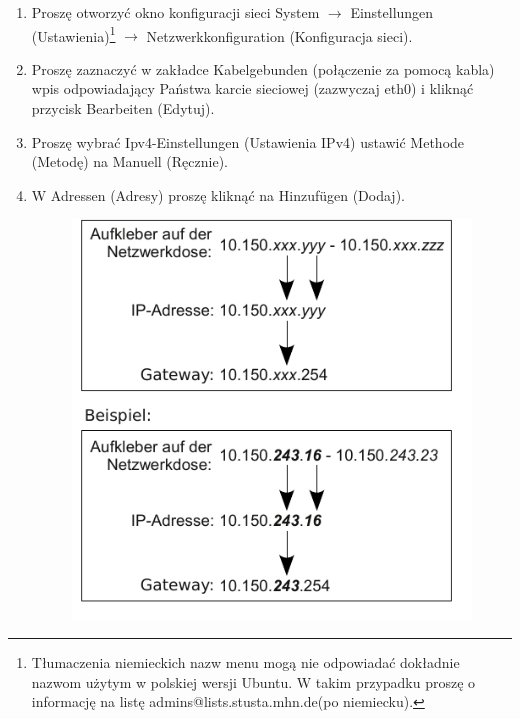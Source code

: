 \documentclass[a4paper,12pt]{scrartcl}
\begin{document}
\begin{enumerate}
    \item Proszę otworzyć okno konfiguracji sieci System $\rightarrow$ Einstellungen (Ustawienia)\footnote{Tłumaczenia niemieckich nazw menu mogą nie odpowiadać dokładnie nazwom użytym w polskiej wersji Ubuntu. W takim przypadku proszę o informację na listę admins@lists.stusta.mhn.de(po niemiecku).} $\rightarrow$ Netzwerkkonfiguration (Konfiguracja sieci).
    \item Proszę zaznaczyć w zakładce Kabelgebunden (połączenie za pomocą kabla) wpis odpowiadający Państwa karcie sieciowej (zazwyczaj eth0) i kliknąć przycisk Bearbeiten (Edytuj).
    \item Proszę wybrać Ipv4-Einstellungen (Ustawienia IPv4) ustawić Methode (Metodę) na Manuell (Ręcznie).
    \item W Adressen (Adresy) proszę kliknąć na Hinzufügen (Dodaj).
      \begin{figure}[h!]
        \centering
        \begin{minipage}[c]{0.45\linewidth}
          \centering
          \includegraphics[width=\linewidth,keepaspectratio]{Bilder/IP_Gerneric}
        \end{minipage}
        \begin{minipage}[c]{0.5\linewidth}
          \centering

\end{minipage}
\end{figure}
\end{enumerate}
\end{document}
